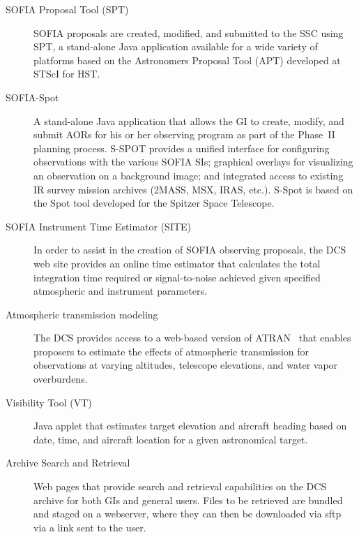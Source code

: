 \begin{description}

\item[SOFIA Proposal Tool (SPT)] SOFIA proposals are created, modified, and submitted to the SSC using SPT, a stand-alone Java application available for a wide variety of platforms based on the Astronomers Proposal Tool (APT)  developed at STScI for HST.


\item[SOFIA-Spot] A stand-alone Java application that allows the GI to create, modify, and submit AORs for his or her observing program as part of the Phase~II planning process. S-SPOT provides a unified interface for configuring observations with the various SOFIA SIs; graphical overlays for visualizing an observation on a background image; and integrated access to existing IR survey mission archives (2MASS, MSX, IRAS, etc.).  S-Spot is based on the Spot tool developed for the Spitzer Space Telescope.

\item[SOFIA Instrument Time Estimator (SITE)] In order to assist in the creation of SOFIA observing proposals, the DCS web site provides an online time estimator that calculates the total integration time required or signal-to-noise achieved given specified atmospheric and instrument parameters. 

\item[Atmospheric transmission modeling] The DCS provides access to a web-based version of ATRAN~\citep{Lord:1992} that enables proposers to estimate the effects of atmospheric transmission for observations at varying altitudes, telescope elevations,  and water vapor overburdens.  

\item[Visibility Tool (VT)] Java applet that estimates target elevation and aircraft heading based on date, time, and aircraft location for a given astronomical target.  

\item[Archive Search and Retrieval] Web pages that provide search and retrieval capabilities on the DCS archive for both GIs and general users.  Files to be retrieved are bundled and staged on a webserver, where they can then be downloaded via sftp via a link sent to the user.

\end{description}

